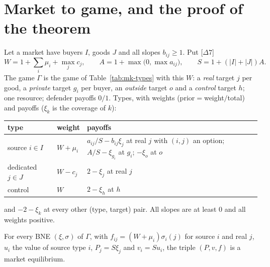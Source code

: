 \section{Market to game, and the proof of the theorem}\label{sec:sh-game}

Let a market have buyers $I$, goods $J$ and all slopes $b_{ij}\ge1$. Put [$\Delta7$]
\[
W=1+\sum_i\mu_i+\max_jc_j,\qquad A=1+\max\bigl(0,\max a_{ij}\bigr),\qquad S=1+(|I|+|J|)A .
\]
The game $\Gamma$ is the game of Table~\ref{tab:mk-types} with this $W$: a \emph{real} target $j$ per
good, a \emph{private} target $g_i$ per buyer, an \emph{outside} target $o$ and a \emph{control} target
$h$; one resource; defender payoffs $0/1$. Types, with weights (prior${}={}$weight$/$total) and payoffs
($\xi_k$ is the coverage of $k$):
\begin{center}
\begin{tabular}{lll}
\toprule
type & weight & payoffs\\
\midrule
source $i\in I$ & $W+\mu_i$ & $a_{ij}/S-b_{ij}\xi_j$ at real $j$ with $(i,j)$ an option; $A/S-\xi_{g_i}$ at $g_i$; $-\xi_o$ at $o$\\
dedicated $j\in J$ & $W-c_j$ & $2-\xi_j$ at real $j$\\
control & $W$ & $2-\xi_h$ at $h$\\
\bottomrule
\end{tabular}
\end{center}
and $-2-\xi_k$ at every other (type, target) pair. All slopes are at least $0$ and all weights positive.

\begin{lemma}\label{lem:sh-embed}
\statuslean
For every BNE $(\xi,\sigma)$ of $\Gamma$, with $f_{ij}=(W+\mu_i)\sigma_i(j)$ for source $i$ and real $j$,
$u_i$ the value of source type $i$, $P_j=S\xi_j$ and $v_i=Su_i$, the triple $(P,v,f)$ is a market
equilibrium.
\end{lemma}

